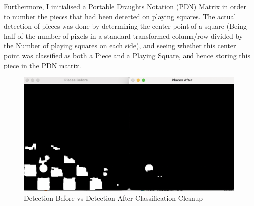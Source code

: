 \documentclass[11pt]{article}
\begin{document}
    \par
    Furthermore, I initialised a Portable Draughts Notation (PDN) Matrix in order to number the pieces that had been detected on playing squares. The actual detection of pieces was done by determining the center point of a square (Being half of the number of pixels in a standard transformed column/row
    divided by the Number of playing squares on each side), and seeing whether this center point was classified as both a Piece and a Playing Square, and hence storing this piece in the PDN matrix.   

    \newpage
    \begin{figure}
        \centering
        \includegraphics[scale = .3]{Bad-v-Good-piece-detection.png}
        \caption{Detection Before vs Detection After Classification Cleanup}
    \end{figure}
\end{document}
